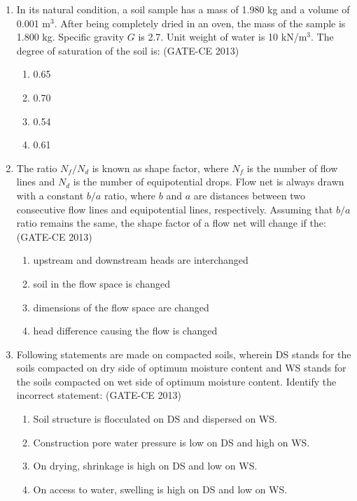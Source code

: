 \documentclass[journal,12pt,onecolumn]{article}
\theoremstyle{remark}
\begin{document}
\begin{enumerate}
    \item In its natural condition, a soil sample has a mass of 1.980 kg and a volume of 0.001 m$^3$. After being completely dried in an oven, the mass of the sample is 1.800 kg. Specific gravity $G$ is 2.7. Unit weight of water is 10 kN/m$^3$. The degree of saturation of the soil is: (GATE-CE 2013)
    \begin{multicols}{4}
    \begin{enumerate}
        \item 0.65 
        \item 0.70 
        \item 0.54 
        \item 0.61
    \end{enumerate}
    \end{multicols}
    
    \item The ratio $N_f/N_d$ is known as shape factor, where $N_f$ is the number of flow lines and $N_d$ is the number of equipotential drops. Flow net is always drawn with a constant $b/a$ ratio, where $b$ and $a$ are distances between two consecutive flow lines and equipotential lines, respectively. Assuming that $b/a$ ratio remains the same, the shape factor of a flow net will change if the: (GATE-CE 2013)
    \begin{enumerate}
        \item upstream and downstream heads are interchanged 
        \item soil in the flow space is changed 
        \item dimensions of the flow space are changed 
        \item head difference causing the flow is changed
    \end{enumerate}
    
    \item Following statements are made on compacted soils, wherein DS stands for the soils compacted on dry side of optimum moisture content and WS stands for the soils compacted on wet side of optimum moisture content. Identify the incorrect statement: (GATE-CE 2013)
    \begin{enumerate}
        \item Soil structure is flocculated on DS and dispersed on WS. 
        \item Construction pore water pressure is low on DS and high on WS. 
        \item On drying, shrinkage is high on DS and low on WS. 
        \item On access to water, swelling is high on DS and low on WS.
    \end{enumerate}
    

\end{enumerate}
\end{document}
